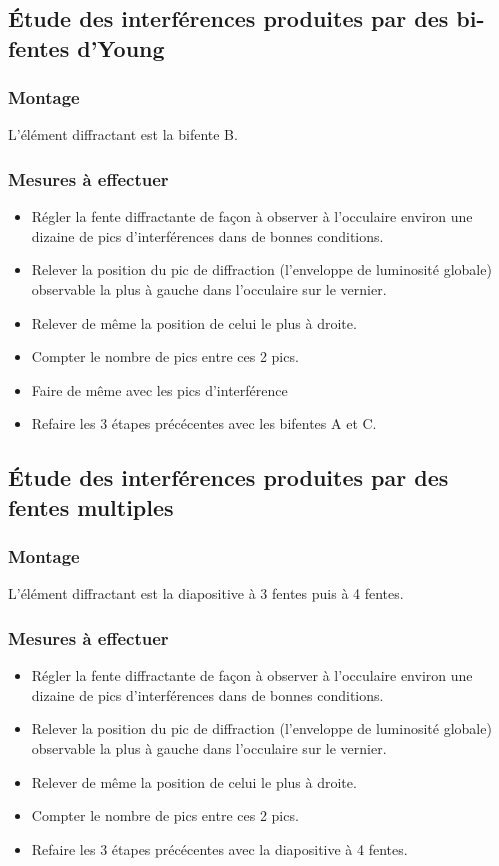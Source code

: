\documentclass[a4paper,9pt,french]{scrartcl}
\begin{document}
\subsection{Étude des interférences produites par des bi-fentes d'Young}
\subsubsection{Montage}
L'élément diffractant est la bifente B.
\subsubsection{Mesures à effectuer}
\begin{itemize}
 \item Régler la fente diffractante de façon à observer à l'occulaire environ une dizaine de pics d'interférences dans de bonnes conditions.
 \item Relever la position du pic de diffraction (l'enveloppe de luminosité globale) observable la plus à gauche dans l'occulaire sur le vernier.
 \item Relever de m\^eme la position de celui le plus à droite.
 \item Compter le nombre de pics entre ces 2 pics.
 \item Faire de m\^eme avec les pics d'interférence
 \item Refaire les 3 étapes précécentes avec les bifentes A et C.
\end{itemize}
\subsection{Étude des interférences produites par des fentes multiples}
\subsubsection{Montage}
L'élément diffractant est la diapositive à 3 fentes puis à 4 fentes.
\subsubsection{Mesures à effectuer}
\begin{itemize}
 \item Régler la fente diffractante de façon à observer à l'occulaire environ une dizaine de pics d'interférences dans de bonnes conditions.
 \item Relever la position du pic de diffraction (l'enveloppe de luminosité globale) observable la plus à gauche dans l'occulaire sur le vernier.
 \item Relever de m\^eme la position de celui le plus à droite.
 \item Compter le nombre de pics entre ces 2 pics.
 \item Refaire les 3 étapes précécentes avec la diapositive à 4 fentes.
\end{itemize}
\end{document}
